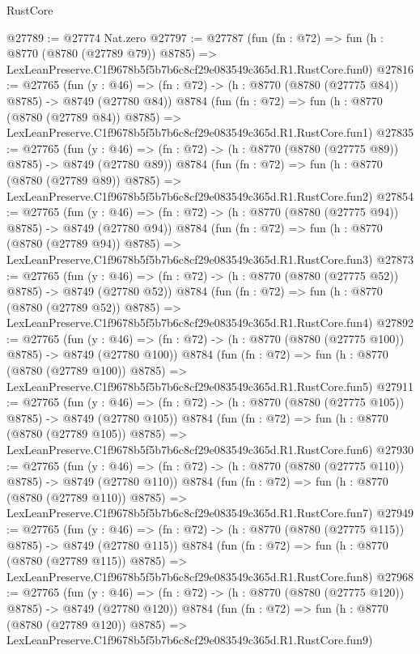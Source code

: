 \begin{lexlean}{RustCore}
\begin{coremodule}
@27789 := @27774 Nat.zero
@27797 := @27787
    (fun (fn : @72) =>
    fun (h : @8770 (@8780 (@27789 @79)) @8785) =>
    LexLeanPreserve.C1f9678b5f5b7b6c8cf29e083549c365d.R1.RustCore.fun0)
@27816 := @27765
    (fun (y : @46) => (fn : @72) -> (h : @8770 (@8780 (@27775 @84)) @8785) -> @8749 (@27780 @84))
    @8784
    (fun (fn : @72) =>
    fun (h : @8770 (@8780 (@27789 @84)) @8785) =>
    LexLeanPreserve.C1f9678b5f5b7b6c8cf29e083549c365d.R1.RustCore.fun1)
@27835 := @27765
    (fun (y : @46) => (fn : @72) -> (h : @8770 (@8780 (@27775 @89)) @8785) -> @8749 (@27780 @89))
    @8784
    (fun (fn : @72) =>
    fun (h : @8770 (@8780 (@27789 @89)) @8785) =>
    LexLeanPreserve.C1f9678b5f5b7b6c8cf29e083549c365d.R1.RustCore.fun2)
@27854 := @27765
    (fun (y : @46) => (fn : @72) -> (h : @8770 (@8780 (@27775 @94)) @8785) -> @8749 (@27780 @94))
    @8784
    (fun (fn : @72) =>
    fun (h : @8770 (@8780 (@27789 @94)) @8785) =>
    LexLeanPreserve.C1f9678b5f5b7b6c8cf29e083549c365d.R1.RustCore.fun3)
@27873 := @27765
    (fun (y : @46) => (fn : @72) -> (h : @8770 (@8780 (@27775 @52)) @8785) -> @8749 (@27780 @52))
    @8784
    (fun (fn : @72) =>
    fun (h : @8770 (@8780 (@27789 @52)) @8785) =>
    LexLeanPreserve.C1f9678b5f5b7b6c8cf29e083549c365d.R1.RustCore.fun4)
@27892 := @27765
    (fun (y : @46) => (fn : @72) -> (h : @8770 (@8780 (@27775 @100)) @8785) -> @8749 (@27780 @100))
    @8784
    (fun (fn : @72) =>
    fun (h : @8770 (@8780 (@27789 @100)) @8785) =>
    LexLeanPreserve.C1f9678b5f5b7b6c8cf29e083549c365d.R1.RustCore.fun5)
@27911 := @27765
    (fun (y : @46) => (fn : @72) -> (h : @8770 (@8780 (@27775 @105)) @8785) -> @8749 (@27780 @105))
    @8784
    (fun (fn : @72) =>
    fun (h : @8770 (@8780 (@27789 @105)) @8785) =>
    LexLeanPreserve.C1f9678b5f5b7b6c8cf29e083549c365d.R1.RustCore.fun6)
@27930 := @27765
    (fun (y : @46) => (fn : @72) -> (h : @8770 (@8780 (@27775 @110)) @8785) -> @8749 (@27780 @110))
    @8784
    (fun (fn : @72) =>
    fun (h : @8770 (@8780 (@27789 @110)) @8785) =>
    LexLeanPreserve.C1f9678b5f5b7b6c8cf29e083549c365d.R1.RustCore.fun7)
@27949 := @27765
    (fun (y : @46) => (fn : @72) -> (h : @8770 (@8780 (@27775 @115)) @8785) -> @8749 (@27780 @115))
    @8784
    (fun (fn : @72) =>
    fun (h : @8770 (@8780 (@27789 @115)) @8785) =>
    LexLeanPreserve.C1f9678b5f5b7b6c8cf29e083549c365d.R1.RustCore.fun8)
@27968 := @27765
    (fun (y : @46) => (fn : @72) -> (h : @8770 (@8780 (@27775 @120)) @8785) -> @8749 (@27780 @120))
    @8784
    (fun (fn : @72) =>
    fun (h : @8770 (@8780 (@27789 @120)) @8785) =>
    LexLeanPreserve.C1f9678b5f5b7b6c8cf29e083549c365d.R1.RustCore.fun9)

\end{coremodule}
\end{lexlean}
